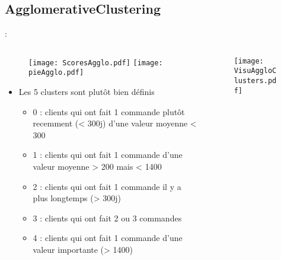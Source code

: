 \documentclass[8pt,aspectratio=169,hyperref={unicode=true}]{beamer}
\begin{document}
\subsection{AgglomerativeClustering}
\begin{frame}{\insertsection: \insertsubsection}
    \begin{columns}
        \begin{column}{.55\textwidth}
            \begin{figure}
                \texttt{[image: ScoresAgglo.pdf]}
                \texttt{[image: pieAgglo.pdf]}
            \end{figure}
            \begin{itemize}
                \item Les 5 clusters sont plutôt bien définis
                      \begin{itemize}
                          \item 0 : clients qui ont fait 1 commande plutôt recemment (< 300j) d'une valeur moyenne < 300
                          \item 1 : clients qui ont fait 1 commande d'une valeur moyenne > 200 mais < 1400
                          \item 2 : clients qui ont fait 1 commande il y a plus longtemps (> 300j)
                          \item 3 : clients qui ont fait 2 ou 3 commandes
                          \item 4 : clients qui ont fait 1 commande d'une valeur importante (> 1400)
                      \end{itemize}
            \end{itemize}
        \end{column}
        \begin{column}{.45\textwidth}
            \begin{figure}
                \texttt{[image: VisuAggloClusters.pdf]}
            \end{figure}
        \end{column}
    \end{columns}
\end{frame}
\end{document}
